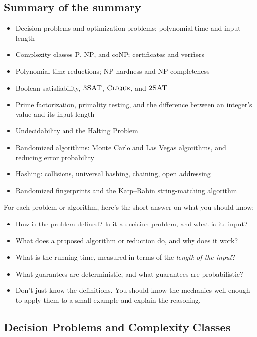 \documentclass[11 pt]{exam}
\begin{document}
	\subsection{Summary of the summary}
	\begin{itemize}
		\item Decision problems and optimization problems; polynomial time and input length
		\item Complexity classes $\mathrm{P}$, $\mathrm{NP}$, and $\mathrm{coNP}$; certificates and verifiers
		\item Polynomial-time reductions; $\mathrm{NP}$-hardness and $\mathrm{NP}$-completeness
		\item Boolean satisfiability, $\textsc{3SAT}$, $\textsc{Clique}$, and $\textsc{2SAT}$
		\item Prime factorization, primality testing, and the difference between an integer's value and its input length
		\item Undecidability and the Halting Problem
		\item Randomized algorithms: Monte Carlo and Las Vegas algorithms, and reducing error probability
		\item Hashing: collisions, universal hashing, chaining, open addressing
		\item Randomized fingerprints and the Karp--Rabin string-matching algorithm
	\end{itemize}

	For each problem or algorithm, here's the short answer on what you should know:

	\begin{itemize}
		\item How is the problem defined? Is it a decision problem, and what is its input?
		\item What does a proposed algorithm or reduction do, and why does it work?
		\item What is the running time, measured in terms of the \emph{length of the input}?
		\item What guarantees are deterministic, and what guarantees are probabilistic?
		\item Don't just know the definitions. You should know the mechanics well enough to apply them to a small example and explain the reasoning.
	\end{itemize}

	\subsection{Decision Problems and Complexity Classes}
\end{document}
